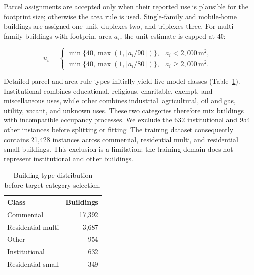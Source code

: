 Parcel assignments are accepted only when their reported use is plausible for the footprint size; otherwise the area rule is used. Single-family and mobile-home buildings are assigned one unit, duplexes two, and triplexes three. For multi-family buildings with footprint area $a_i$, the unit estimate is capped at 40:

\begin{equation}
u_i =
\begin{cases}
\min\{40,\max(1,\lfloor a_i/90\rfloor)\}, & a_i < 2{,}000\,\mathrm{m}^2,\\
\min\{40,\max(1,\lfloor a_i/80\rfloor)\}, & a_i \geq 2{,}000\,\mathrm{m}^2.
\end{cases}
\label{eq:units}
\end{equation}

Detailed parcel and area-rule types initially yield five model classes (Table~\ref{tab:stage2a_classes}). Institutional combines educational, religious, charitable, exempt, and miscellaneous uses, while other combines industrial, agricultural, oil and gas, utility, vacant, and unknown uses. These two categories therefore mix buildings with incompatible occupancy processes. We exclude the 632 institutional and 954 other instances before splitting or fitting. The training dataset consequently contains 21,428 instances across commercial, residential multi, and residential small buildings. This exclusion is a limitation: the training domain does not represent institutional and other buildings.

\begin{table}[t]
\centering
\caption{Building-type distribution before target-category selection.}
\label{tab:stage2a_classes}
\small
\begin{tabular}{lr}
\toprule
Class & Buildings \\
\midrule
Commercial & 17,392 \\
Residential multi & 3,687 \\
Other & 954 \\
Institutional & 632 \\
Residential small & 349 \\
\bottomrule
\end{tabular}
\end{table}

